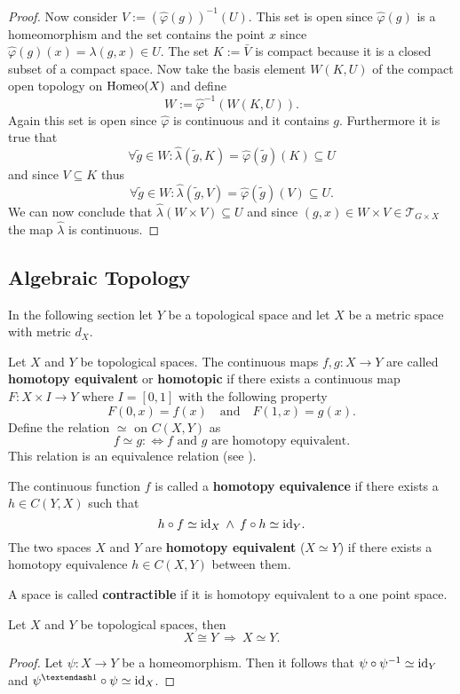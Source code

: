 \begin{proof}
  Now consider $V := (\hat{\varphi}(g))^{-1}(U)$. This set is open since $\hat{\varphi}(g)$ is a homeomorphism and the set contains the point $x$ since $\hat{\varphi}(g)(x) = \lambda(g, x) \in U$. The set $K := \bar{V}$ is compact because it is a closed subset of a compact space. Now take the basis element $W(K, U)$ of the compact open topology on ${\rm Homeo}(X)$ and define $$W := \hat{\varphi}^{-1}(W(K,U)).$$ Again this set is open since $\hat{\varphi}$ is continuous and it contains $g$. Furthermore it is true that $$ \forall \tilde{g}\in W\colon \hat{\lambda}(\tilde{g}, K) = \hat{\varphi}(\tilde{g})(K) \subseteq U$$ and since $V \subseteq K$ thus $$\forall \tilde{g}\in W\colon \hat{\lambda}(\tilde{g}, V) = \hat{\varphi}(\tilde{g})(V) \subseteq U.$$ We can now conclude that $\hat{\lambda}(W \times V) \subseteq U$ and since $(g, x) \in W\times V \in \mathcal{T}_{G\times X}$ the map $\hat{\lambda}$ is continuous.
\end{proof}

\subsection{Algebraic Topology}
In the following section let $Y$ be a topological space and let $X$ be a metric space with metric $d_X$.

\begin{defin}
  Let $X$ and $Y$ be topological spaces. The continuous maps $f,g\colon X \to Y$ are called \textbf{homotopy equivalent} or \textbf{homotopic} if there exists a continuous map $F\colon X \times I \to Y$ where $I = [0, 1]$ with the following property \[F(0,x) = f(x) \quad \text{and} \quad F(1,x) = g(x).\]
 Define the relation $\simeq$ on $C(X, Y)$ as \[f \simeq g \colon\iff f \text{ and } g \text{ are homotopy equivalent}.\] This relation is an equivalence relation (see \cite[Lemma 51.1]{MunTop}). 

  The continuous function $f$ is called a \textbf{homotopy equivalence} if there exists a $h \in C(Y, X)$ such that
  \begin{equation*}
    h \circ f \simeq {\rm id}_X \: \land \: f \circ h \simeq {\rm id}_Y.
  \end{equation*}
  The two spaces $X$ and $Y$ are \textbf{homotopy equivalent} ($X \simeq Y$) if there exists a homotopy equivalence $h \in C(X, Y)$ between them.

  A space is called \textbf{contractible} if it is homotopy equivalent to a one point space.
\end{defin}

\begin{lemma}
  Let $X$ and $Y$ be topological spaces, then
  \begin{equation*}
    X \cong Y \: \Rightarrow \: X \simeq Y.
  \end{equation*}
\end{lemma}

\begin{proof}
  Let $\psi\colon X \to Y$ be a homeomorphism. Then it follows that $\psi \circ \psi^{-1} \simeq {\rm id}_Y$ and $\psi^{–1} \circ \psi \simeq \id_X$.  
\end{proof}
